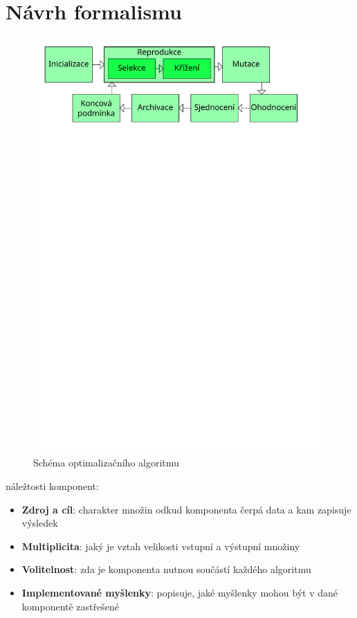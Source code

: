 \section{Návrh formalismu}





\begin{figure}[h!]\label{nase schema}
  \includegraphics[width=\textwidth]{img/OASchema}
  \caption{Schéma optimalizačního algoritmu}
\end{figure}


náležtosti komponent:
\begin{itemize}
  \item \textbf{Zdroj a cíl}: charakter množin odkud komponenta čerpá data a kam zapisuje výsledek
  \item \textbf{Multiplicita}: jaký je vztah velikosti vstupní a výstupní množiny
  \item \textbf{Volitelnost}: zda je komponenta nutnou součástí každého algoritmu
  \item \textbf{Implementované myšlenky}: popisuje, jaké myšlenky mohou být v dané komponentě zastřešené
\end{itemize}

